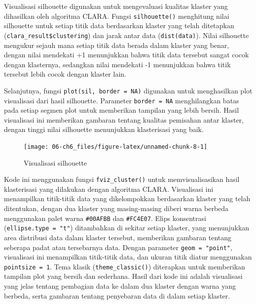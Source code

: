\documentclass[
  oneside]{book}
\newenvironment{Shaded}{\begin{snugshade}}{\end{snugshade}}
\newcommand{\AttributeTok}[1]{\textcolor[rgb]{0.13,0.29,0.53}{#1}}
\newcommand{\ConstantTok}[1]{\textcolor[rgb]{0.56,0.35,0.01}{#1}}
\newcommand{\FunctionTok}[1]{\textcolor[rgb]{0.13,0.29,0.53}{\textbf{#1}}}
\newcommand{\NormalTok}[1]{#1}
\newcommand{\OtherTok}[1]{\textcolor[rgb]{0.56,0.35,0.01}{#1}}
\newcommand{\SpecialCharTok}[1]{\textcolor[rgb]{0.81,0.36,0.00}{\textbf{#1}}}
\begin{document}
Visualisasi silhouette digunakan untuk mengevaluasi kualitas klaster yang dihasilkan oleh algoritma CLARA. Fungsi \texttt{silhouette()} menghitung nilai silhouette untuk setiap titik data berdasarkan klaster yang telah ditetapkan (\texttt{clara\_result\$clustering}) dan jarak antar data (\texttt{dist(data)}). Nilai silhouette mengukur sejauh mana setiap titik data berada dalam klaster yang benar, dengan nilai mendekati +1 menunjukkan bahwa titik data tersebut sangat cocok dengan klasternya, sedangkan nilai mendekati -1 menunjukkan bahwa titik tersebut lebih cocok dengan klaster lain.

Selanjutnya, fungsi \texttt{plot(sil,\ border\ =\ NA)} digunakan untuk menghasilkan plot visualisasi dari hasil silhouette. Parameter \texttt{border\ =\ NA} menghilangkan batas pada setiap segmen plot untuk memberikan tampilan yang lebih bersih. Hasil visualisasi ini memberikan gambaran tentang kualitas pemisahan antar klaster, dengan tinggi nilai silhouette menunjukkan klasterisasi yang baik.

\begin{Shaded}
\end{Shaded}

\begin{figure}[h]

{\centering \texttt{[image: 06-ch6\_files/figure-latex/unnamed-chunk-8-1]} 

}

\caption{Visualisasi silhouette}\label{fig:unnamed-chunk-8}
\end{figure}

Kode ini menggunakan fungsi \texttt{fviz\_cluster()} untuk memvisualisasikan hasil klasterisasi yang dilakukan dengan algoritma CLARA. Visualisasi ini menampilkan titik-titik data yang dikelompokkan berdasarkan klaster yang telah ditentukan, dengan dua klaster yang masing-masing diberi warna berbeda menggunakan palet warna \texttt{\#00AFBB} dan \texttt{\#FC4E07}. Elips konsentrasi (\texttt{ellipse.type\ =\ "t"}) ditambahkan di sekitar setiap klaster, yang menunjukkan area distribusi data dalam klaster tersebut, memberikan gambaran tentang seberapa padat atau tersebarnya data. Dengan parameter \texttt{geom\ =\ "point"}, visualisasi ini menampilkan titik-titik data, dan ukuran titik diatur menggunakan \texttt{pointsize\ =\ 1}. Tema klasik (\texttt{theme\_classic()}) diterapkan untuk memberikan tampilan plot yang bersih dan sederhana. Hasil dari kode ini adalah visualisasi yang jelas tentang pembagian data ke dalam dua klaster dengan warna yang berbeda, serta gambaran tentang penyebaran data di dalam setiap klaster.
\end{document}
